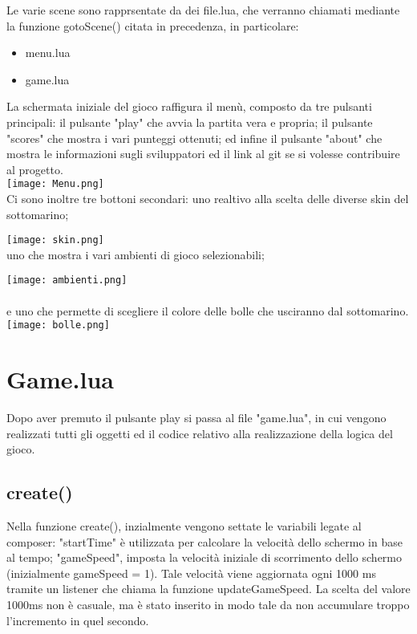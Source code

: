 \documentclass[12pt]{article}
\begin{document}
Le varie scene sono rapprsentate da dei file.lua, che verranno chiamati mediante la funzione gotoScene() citata in precedenza, in particolare:
\begin{itemize}
    \item menu.lua
    \item game.lua
\end{itemize}



La schermata iniziale del gioco raffigura il menù, composto da tre pulsanti principali: il pulsante "play" che avvia la partita vera e propria; il pulsante "scores" che mostra i vari punteggi ottenuti; ed infine il pulsante "about" che mostra le informazioni sugli sviluppatori ed il link al git se si volesse contribuire al progetto. \\

\texttt{[image: Menu.png]}\\
Ci sono inoltre tre bottoni secondari: uno realtivo alla scelta delle diverse skin del sottomarino; 

\texttt{[image: skin.png]}\\

uno che mostra i vari ambienti di gioco selezionabili; 

\texttt{[image: ambienti.png]}\\
\\
e uno che permette di scegliere il colore delle bolle che usciranno dal sottomarino. 
\\

\texttt{[image: bolle.png]}\\

\section{Game.lua}
Dopo aver premuto il pulsante play si passa al file "game.lua", in cui vengono realizzati tutti gli oggetti ed il codice relativo alla realizzazione della logica del gioco. 
\subsection{create()}
Nella funzione create(), inzialmente vengono settate le variabili legate al composer: "startTime" è utilizzata per calcolare la velocità dello schermo in base al tempo; "gameSpeed", imposta la velocità iniziale di scorrimento dello schermo (inizialmente gameSpeed = 1). Tale velocità viene aggiornata ogni 1000 ms tramite un listener che chiama la funzione updateGameSpeed. La scelta del valore 1000ms non è casuale, ma è stato inserito in modo tale da non accumulare troppo l'incremento in quel secondo.
\\
\end{document}
